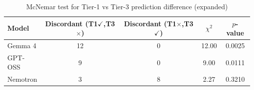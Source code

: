 \begin{table}[htbp]
\centering
\caption{McNemar test for Tier-1 vs Tier-3 prediction difference (expanded)}
\label{tab:mcnemar_v2}
\begin{tabular}{lcccc}
\toprule
\textbf{Model} & \textbf{Discordant (T1$\checkmark$,T3$\times$)} & \textbf{Discordant (T1$\times$,T3$\checkmark$)} & \textbf{$\chi^2$} & \textbf{$p$-value} \\
\midrule
Gemma 4 & 12 & 0 & 12.00 & 0.0025 \\
GPT-OSS & 9 & 0 & 9.00 & 0.0111 \\
Nemotron & 3 & 8 & 2.27 & 0.3210 \\
\bottomrule
\end{tabular}
\end{table}

